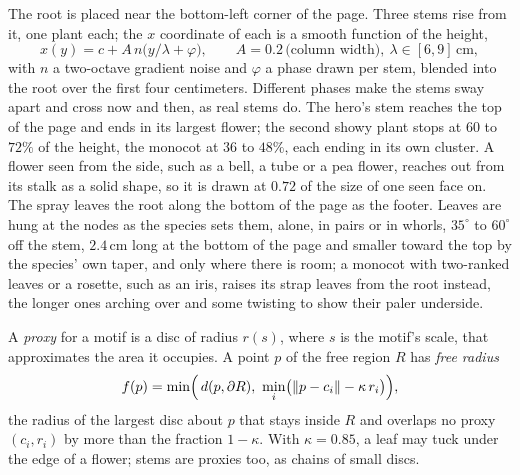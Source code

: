 \begin{construction}[Stems]
The root is placed near the bottom-left corner of the page. Three stems rise from it, one
plant each; the $x$ coordinate of each is a smooth function of the height,
\[
  x(y)=c+A\,n\bigl(y/\lambda+\varphi\bigr),
  \qquad A=0.2\,\text{(column width)},\ \lambda\in[6,9]\,\text{cm},
\]
with $n$ a two-octave gradient noise and $\varphi$ a phase drawn per stem, blended into the
root over the first four centimeters. Different phases make the stems sway apart and cross
now and then, as real stems do. The hero's stem reaches the top of the page and ends in its
largest flower; the second showy plant stops at $60$ to $72\%$ of the height, the monocot at
$36$ to $48\%$, each ending in its own cluster. A flower seen from the side, such as a bell,
a tube or a pea flower, reaches out from its stalk as a solid shape, so it is drawn at $0.72$
of the size of one seen face on. The spray leaves the root along the bottom of
the page as the footer. Leaves are hung at the nodes as the species sets them, alone, in pairs
or in whorls, $35^\circ$ to $60^\circ$ off the stem, $2.4\,$cm long at the bottom of the page
and smaller toward the top by the species' own taper, and only where there is room; a
monocot with two-ranked leaves or a rosette, such as an iris, raises its strap leaves from the
root instead, the longer ones arching over and
some twisting to show their paler underside.
\end{construction}

\begin{definition}
A \emph{proxy} for a motif is a disc of radius $r(s)$, where $s$ is the motif's scale, that
approximates the area it occupies. A point $p$ of the free region $R$ has \emph{free
radius}
\[
  f(p)=\min\Bigl(\,d(p,\partial R),\ \min_i\bigl(\lVert p-c_i\rVert-\kappa\,r_i\bigr)\Bigr),
\]
the radius of the largest disc about $p$ that stays inside $R$ and overlaps no proxy
$(c_i,r_i)$ by more than the fraction $1-\kappa$. With $\kappa=0.85$, a leaf may tuck under
the edge of a flower; stems are proxies too, as chains of small discs.
\end{definition}


